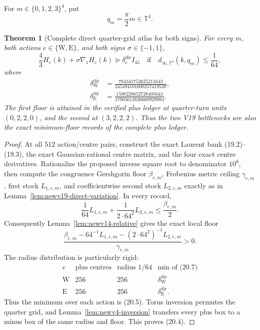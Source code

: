 \documentclass[11pt,oneside]{article}
\newtheorem{theorem}{Theorem}[section]
\theoremstyle{definition}
\theoremstyle{remark}
\begin{document}
For \(m\in\{0,1,2,3\}^4\), put
\[
 q_m=\frac{\pi}{2}m\in\mathbb T^4.                       \tag{20.3}
\]

\begin{theorem}[Complete direct quarter-grid atlas for both signs]
\label{thm:newv20-direct-grid}
For every \(m\), both actions
\(e\in\{\mathrm W,\mathrm E\}\), and both signs
\(\sigma\in\{-1,1\}\),
\[
 \frac43H_e(k)+\sigma\nabla_1H_e(k)
 \succeq\delta_e^{\mathrm{dir}}I_{45}
 \quad\text{if}\quad
 d_{\infty,\mathbb T^4}(k,q_m)\le\frac1{64},             \tag{20.4}
\]
where
\[
\begin{aligned}
\delta_{\mathrm W}^{\mathrm{dir}}
&=\frac{784341753625211643}{245494101600257419520},\\
\delta_{\mathrm E}^{\mathrm{dir}}
&=\frac{1598228652728405643}{17905613826669929984}.
\end{aligned}                                            \tag{20.5}
\]
The first floor is attained in the verified plus ledger at
quarter-turn units \((0,2,2,0)\), and the second at
\((3,2,2,2)\).  Thus the two V19 bottlenecks are also the exact
minimum-floor records of the complete plus ledger.
\end{theorem}

\begin{proof}
At all \(512\) action/centre pairs, construct the exact Laurent bank
(19.2)--(19.3), the exact Gaussian-rational centre matrix, and the
four exact centre derivatives.  Rationalize the proposed inverse
square root to denominator \(10^8\), then compute the congruence
Gershgorin floor \(\beta_{e,m}\), Frobenius metric ceiling
\(\gamma_{e,m}\), first stock \(L_{1,e,m}\), and coefficientwise
second stock \(L_{2,e,m}\) exactly as in
Lemma~\ref{lem:newv19-direct-variation}.  In every record,
\[
 \frac1{64}L_{1,e,m}
 +\frac1{2\cdot64^2}L_{2,e,m}
 \le\frac{\beta_{e,m}}2.                                 \tag{20.6}
\]
Consequently Lemma~\ref{lem:newv14-relative} gives the exact local
floor
\[
 \frac{\beta_{e,m}-
 64^{-1}L_{1,e,m}-(2\cdot64^2)^{-1}L_{2,e,m}}
 {\gamma_{e,m}}>0.                                       \tag{20.7}
\]
The radius distribution is particularly rigid:
\[
\begin{array}{c|c|c|c}
e&\text{plus centres}&\text{radius }1/64&
\min\text{ of (20.7)}\\ \hline
\mathrm W&256&256&\delta_{\mathrm W}^{\mathrm{dir}}\\
\mathrm E&256&256&\delta_{\mathrm E}^{\mathrm{dir}}.
\end{array}                                              \tag{20.8}
\]
Thus the minimum over each action is (20.5).  Torus inversion
permutes the quarter grid, and
Lemma~\ref{lem:newv4-inversion} transfers every plus box to a minus
box of the same radius and floor.  This proves (20.4).
\end{proof}
\end{document}
